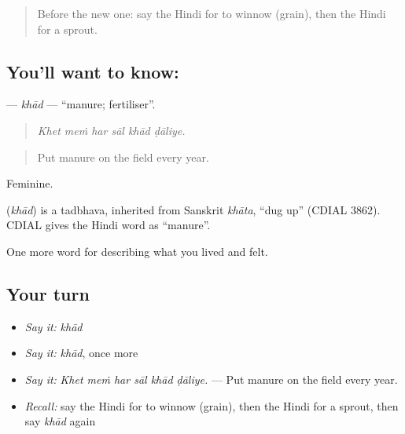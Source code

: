 \begin{quote}
Before the new one: say the Hindi for to winnow (grain), then the Hindi for a sprout.
\end{quote}

\subsection*{You'll want to know: }
\textbf{} — \emph{khād} — \textquotedblleft{}manure; fertiliser\textquotedblright{}.

\begin{quote}
     
\end{quote}

\begin{quote}
\emph{Khet meṁ har sāl khād ḍāliye.}
\end{quote}

\begin{quote}
Put manure on the field every year.
\end{quote}

Feminine.

\begin{cousinweb}
\textbf{} (\emph{khād}) is a tadbhava, inherited from Sanskrit \emph{khāta}, \textquotedblleft{}dug up\textquotedblright{} (CDIAL 3862). CDIAL gives the Hindi word as \textquotedblleft{}manure\textquotedblright{}.
\end{cousinweb}

\begin{grammarlens}[title={What you've built}]
One more word for describing what you lived and felt.
\end{grammarlens}

\subsection*{Your turn}
\begin{itemize}
\raggedright
  \item \emph{Say it:} \emph{khād}
  \item \emph{Say it:} \emph{khād}, once more
  \item \emph{Say it:} \emph{Khet meṁ har sāl khād ḍāliye.} — Put manure on the field every year.
  \item \emph{Recall:} say the Hindi for to winnow (grain), then the Hindi for a sprout, then say \emph{khād} again
\end{itemize}

